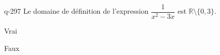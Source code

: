 \begin{truefalse}{q-297}
Le domaine de définition de l'expression $\dfrac{1}{x^2-3x}$ est $\mathbb R \setminus \{0,3\}$.
\item* Vrai
\item Faux
\end{truefalse}

